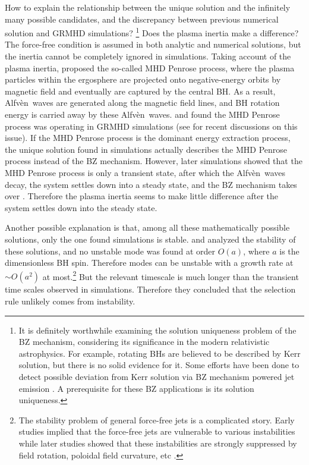 \documentclass[iop,apj]{emulateapj}
\def\Alfven{Alfv\`en}
\begin{document}
How to explain the relationship between the unique solution
and the infinitely many possible candidates, and the discrepancy between
previous numerical solution and GRMHD simulations?
\footnote{It is definitely worthwhile examining the solution uniqueness problem of
the BZ mechanism, considering its significance in the modern relativistic astrophysics.
For example, rotating BHs are believed to be described by Kerr solution, but there is
no solid evidence for it. Some efforts have been done to detect possible deviation from Kerr solution
via BZ mechanism powered jet emission \citep[e.g.][]{Bambi2012b, Bambi2012, Bambi2015, Pei2016}.
A prerequisite for these BZ applications is its solution uniqueness.}
Does the plasma inertia make a difference? The force-free condition is assumed in
both analytic and numerical solutions, but the inertia cannot be completely
ignored in simulations. Taking account of the plasma inertia, \citet{Takahashi1990}
proposed the so-called MHD Penrose process, where the plasma particles within the
ergosphere are projected onto negative-energy orbits by magnetic field and
eventually are captured by the central BH. As a result,  \Alfven\ waves are
generated along the magnetic field lines, and BH rotation energy is carried away
by these \Alfven\ waves. \citet{Koide2002} and \citet{Koide2003} found the
MHD Penrose process was operating in GRMHD simulations (see \citealp[e.g.][]{Lasota2014,
Koide2014,Toma2014,Kojima2015,Toma2016}  for recent discussions on this issue).
If the MHD Penrose process is the dominant energy extraction process, the unique
solution found in simulations actually describes the MHD Penrose process instead
of the BZ mechanism. However, later simulations showed that the MHD Penrose process
is only a transient state, after which the \Alfven\ waves decay, the system settles
down into a steady state, and the BZ mechanism takes over \citep[e.g.][]{Komissarov2005}.
Therefore the plasma inertia seems to make little difference after the system settles
down into the steady state.

Another possible explanation is that, among all these mathematically possible
solutions, only the one found simulations is stable.
\citet{Yang2014} and \citet{Yang2015} analyzed the stability of these solutions,
and no unstable mode was found at order $O(a)$, where $a$ is the dimensionless
BH spin. Therefore modes can be unstable with a growth rate at $\sim O(a^2)$
at most.\footnote{The stability problem of general force-free jets is a complicated story.
Early studies implied that the force-free jets are vulnerable to various instabilities
\citep[e.g.][]{Begelman1998,Lyubarskii1999, Li2000, Wang2004}
while later studies showed that these instabilities are strongly suppressed by
field rotation, poloidal field curvature, etc
\citep[e.g.][and references therein]{Tomimatsu2001, McKinney2009a, Narayan2009g}.}
But the relevant timescale is
much longer than the  transient time scales observed in simulations.  Therefore
they concluded that the selection rule unlikely comes from instability.
\end{document}
